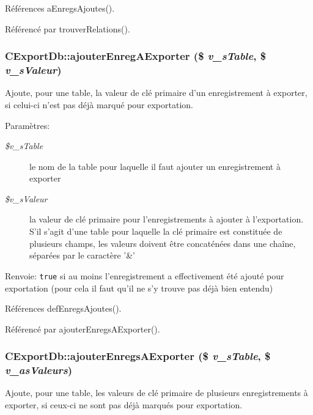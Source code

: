 Références aEnregsAjoutes().

Référencé par trouverRelations().
\subsubsection{\setlength{\rightskip}{0pt plus 5cm}CExportDb::ajouterEnregAExporter (\$ {\em v\_\-sTable}, \/  \$ {\em v\_\-sValeur})}\label{class_c_export_db_684a7327e368ad6c2bc13596d32e2106}


Ajoute, pour une table, la valeur de clé primaire d'un enregistrement à exporter, si celui-ci n'est pas déjà marqué pour exportation. 

\begin{Desc}
\item[Paramètres:]
\begin{description}
\item[{\em \$v\_\-sTable}]le nom de la table pour laquelle il faut ajouter un enregistrement à exporter \item[{\em \$v\_\-sValeur}]la valeur de clé primaire pour l'enregistrements à ajouter à l'exportation. S'il s'agit d'une table pour laquelle la clé primaire est constituée de plusieurs champs, les valeurs doivent être concaténées dans une chaîne, séparées par le caractère '\&'\end{description}
\end{Desc}
\begin{Desc}
\item[Renvoie:]{\tt true} si au moins l'enregistrement a effectivement été ajouté pour exportation (pour cela il faut qu'il ne s'y trouve pas déjà bien entendu) \end{Desc}


Références defEnregsAjoutes().

Référencé par ajouterEnregsAExporter().
\subsubsection{\setlength{\rightskip}{0pt plus 5cm}CExportDb::ajouterEnregsAExporter (\$ {\em v\_\-sTable}, \/  \$ {\em v\_\-asValeurs})}\label{class_c_export_db_d4c11f1d40245ba6002e6d5ec0b80cd4}


Ajoute, pour une table, les valeurs de clé primaire de plusieurs enregistrements à exporter, si ceux-ci ne sont pas déjà marqués pour exportation. 

